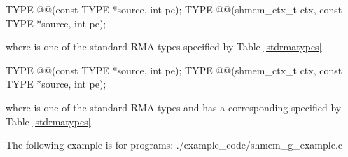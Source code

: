 
\begin{apidefinition}

\begin{C11synopsis}
TYPE @@(const TYPE *source, int pe);
TYPE @@(shmem_ctx_t ctx, const TYPE *source, int pe);
\end{C11synopsis}
where \TYPE{} is one of the standard \ac{RMA} types specified by Table \ref{stdrmatypes}.

\begin{Csynopsis}
TYPE @@(const TYPE *source, int pe);
TYPE @@(shmem_ctx_t ctx, const TYPE *source, int pe);
\end{Csynopsis}
where \TYPE{} is one of the standard \ac{RMA} types and has a corresponding \TYPENAME{} specified by Table \ref{stdrmatypes}.

\begin{apiarguments}
\end{apiarguments}




\begin{apiexamples}

\apicexample
    {The following  example is for \Cstd[11] programs:}
    {./example_code/shmem_g_example.c}
    {}
\end{apiexamples}

\end{apidefinition}
